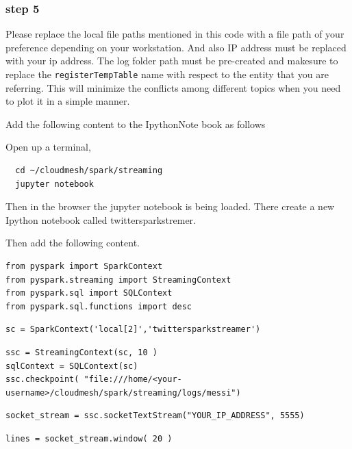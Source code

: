 \subsubsection{step 5}

\begin{NOTE}
  Please replace the local file paths mentioned in this code with a
  file path of your preference depending on your workstation. And also
  IP address must be replaced with your ip address. The log folder
  path must be pre-created and makesure to replace the
  \verb|registerTempTable| name with respect to the entity that you
  are referring. This will minimize the conflicts among different
  topics when you need to plot it in a simple manner.
\end{NOTE}

Add the following content to the IpythonNote book as follows

Open up a terminal,

\begin{lstlisting}
  cd ~/cloudmesh/spark/streaming
  jupyter notebook
\end{lstlisting}

Then in the browser the jupyter notebook is being loaded.  There
create a new Ipython notebook called twittersparkstremer.

Then add the following content. 

\begin{lstlisting}
from pyspark import SparkContext
from pyspark.streaming import StreamingContext
from pyspark.sql import SQLContext
from pyspark.sql.functions import desc
\end{lstlisting}

\begin{lstlisting}
sc = SparkContext('local[2]','twittersparkstreamer')
\end{lstlisting}

\begin{lstlisting}
ssc = StreamingContext(sc, 10 )
sqlContext = SQLContext(sc)
ssc.checkpoint( "file:///home/<your-username>/cloudmesh/spark/streaming/logs/messi")
\end{lstlisting}

\begin{lstlisting}
socket_stream = ssc.socketTextStream("YOUR_IP_ADDRESS", 5555)
\end{lstlisting}

\begin{lstlisting}
lines = socket_stream.window( 20 )
\end{lstlisting}

